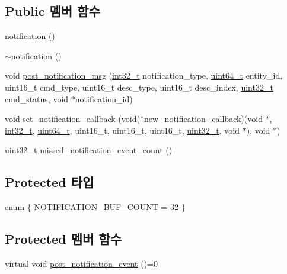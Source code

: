 \subsection*{Public 멤버 함수}
\begin{DoxyCompactItemize}
\item 
\hyperlink{classavdecc__lib_1_1notification_a30e85fd698eab48b5978e18e895b27eb}{notification} ()
\item 
\hyperlink{classavdecc__lib_1_1notification_ab79a31a047cbab198dc5460081537939}{$\sim$notification} ()
\item 
void \hyperlink{classavdecc__lib_1_1notification_a2775ca78354ea78d68bf107c084b3822}{post\+\_\+notification\+\_\+msg} (\hyperlink{parse_8c_a37994e3b11c72957c6f454c6ec96d43d}{int32\+\_\+t} notification\+\_\+type, \hyperlink{parse_8c_aec6fcb673ff035718c238c8c9d544c47}{uint64\+\_\+t} entity\+\_\+id, uint16\+\_\+t cmd\+\_\+type, uint16\+\_\+t desc\+\_\+type, uint16\+\_\+t desc\+\_\+index, \hyperlink{parse_8c_a6eb1e68cc391dd753bc8ce896dbb8315}{uint32\+\_\+t} cmd\+\_\+status, void $\ast$notification\+\_\+id)
\item 
void \hyperlink{classavdecc__lib_1_1notification_abdf19db77644e724db59c66a2cf7c5fb}{set\+\_\+notification\+\_\+callback} (void($\ast$new\+\_\+notification\+\_\+callback)(void $\ast$, \hyperlink{parse_8c_a37994e3b11c72957c6f454c6ec96d43d}{int32\+\_\+t}, \hyperlink{parse_8c_aec6fcb673ff035718c238c8c9d544c47}{uint64\+\_\+t}, uint16\+\_\+t, uint16\+\_\+t, uint16\+\_\+t, \hyperlink{parse_8c_a6eb1e68cc391dd753bc8ce896dbb8315}{uint32\+\_\+t}, void $\ast$), void $\ast$)
\item 
\hyperlink{parse_8c_a6eb1e68cc391dd753bc8ce896dbb8315}{uint32\+\_\+t} \hyperlink{classavdecc__lib_1_1notification_a0a10f05e683c8350e8afa802b8640cbf}{missed\+\_\+notification\+\_\+event\+\_\+count} ()
\end{DoxyCompactItemize}
\subsection*{Protected 타입}
\begin{DoxyCompactItemize}
\item 
enum \{ \hyperlink{classavdecc__lib_1_1notification_abc6126af1d45847bc59afa0aa3216b04ada38b9a5f8c87a3601acb7600b015401}{N\+O\+T\+I\+F\+I\+C\+A\+T\+I\+O\+N\+\_\+\+B\+U\+F\+\_\+\+C\+O\+U\+NT} = 32
 \}
\end{DoxyCompactItemize}
\subsection*{Protected 멤버 함수}
\begin{DoxyCompactItemize}
\item 
virtual void \hyperlink{classavdecc__lib_1_1notification_ac5cb485393e5d7e2ff19e7ee8945a0bd}{post\+\_\+notification\+\_\+event} ()=0
\end{DoxyCompactItemize}
